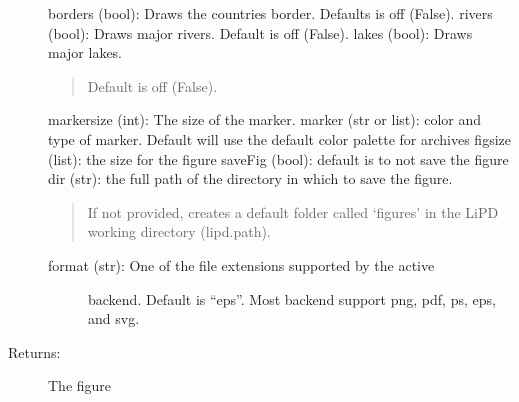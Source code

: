 \documentclass[letterpaper,10pt,english]{sphinxmanual}
\begin{document}
\begin{fulllineitems}
\begin{description}
borders (bool): Draws the countries border. Defaults is off (False). 
rivers (bool): Draws major rivers. Default is off (False).
lakes (bool): Draws major lakes.
\begin{quote}

Default is off (False).
\end{quote}

markersize (int): The size of the marker.
marker (str or list): color and type of marker. Default will use the
default color palette for archives
figsize (list): the size for the figure
saveFig (bool): default is to not save the figure
dir (str): the full path of the directory in which to save the figure.
\begin{quote}

If not provided, creates a default folder called ‘figures’ in the
LiPD working directory (lipd.path).
\end{quote}
\begin{description}
\item[{format (str): One of the file extensions supported by the active}] \leavevmode
backend. Default is “eps”. Most backend support png, pdf, ps, eps,
and svg.

\end{description}

\item[{Returns:}] \leavevmode
The figure

\end{description}

\end{fulllineitems}

\end{document}
